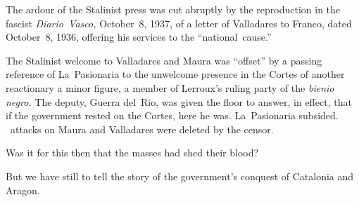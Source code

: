 The ardour of the Stalinist press was cut abruptly by the reproduction in the fascist \emph{Diario~Vasco,} October~8, 1937, of a letter of Va\-lla\-da\-res to Franco, dated October~8, 1936, offering his services to the ``national~cause.''

The Stalinist welcome to Valladares and Maura was ``offset'' by a passing reference of La~Pasionaria to the unwelcome presence in the Cortes of another reactionary a minor figure, a member of Lerroux’s ruling party of the \emph{bienio negro.} The deputy, Guerra del~Rio, was given the floor to answer, in effect, that if the government rested on the Cortes, here he was. La~Pasionaria subsided. \CNT\ attacks on Maura and Valladares were deleted by the censor.

\medskip
Was it for this then that the masses had shed their blood?
\medskip

But we have still to tell the story of the government’s conquest of Catalonia and Aragon.